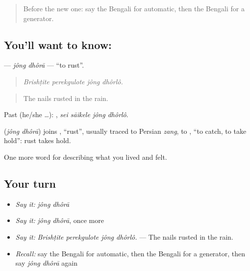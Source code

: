 \begin{quote}
Before the new one: say the Bengali for automatic, then the Bengali for a generator.
\end{quote}

\subsection*{You'll want to know:  }
\textbf{ } — \emph{jông dhôrā} — \textquotedblleft{}to rust\textquotedblright{}.

\begin{quote}
   
\end{quote}

\begin{quote}
\emph{Brishṭite perekgulote jông dhôrlô.}
\end{quote}

\begin{quote}
The nails rusted in the rain.
\end{quote}

Past (he/she …):    , \emph{sei sāikele jông dhôrlô}.

\begin{cousinweb}
\textbf{ } (\emph{jông dhôrā}) joins , \textquotedblleft{}rust\textquotedblright{}, usually traced to Persian \emph{zang}, to , \textquotedblleft{}to catch, to take hold\textquotedblright{}: rust takes hold.
\end{cousinweb}

\begin{grammarlens}[title={What you've built}]
One more word for describing what you lived and felt.
\end{grammarlens}

\subsection*{Your turn}
\begin{itemize}
\raggedright
  \item \emph{Say it:} \emph{jông dhôrā}
  \item \emph{Say it:} \emph{jông dhôrā}, once more
  \item \emph{Say it:} \emph{Brishṭite perekgulote jông dhôrlô.} — The nails rusted in the rain.
  \item \emph{Recall:} say the Bengali for automatic, then the Bengali for a generator, then say \emph{jông dhôrā} again
\end{itemize}

